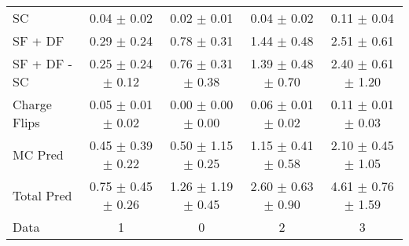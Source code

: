 \begin{tabular}{l|cccc}
                                 SC &  0.04 $\pm$  0.02 &  0.02 $\pm$  0.01 &  0.04 $\pm$  0.02 &  0.11 $\pm$  0.04 \\
                            SF + DF &  0.29 $\pm$  0.24 &  0.78 $\pm$  0.31 &  1.44 $\pm$  0.48 &  2.51 $\pm$  0.61 \\
\hline
                       SF + DF - SC &  0.25 $\pm$  0.24 $\pm$  0.12 &  0.76 $\pm$  0.31 $\pm$  0.38 &  1.39 $\pm$  0.48 $\pm$  0.70 &  2.40 $\pm$  0.61 $\pm$  1.20 \\
\hline\hline
                       Charge Flips &  0.05 $\pm$  0.01 $\pm$  0.02 &  0.00 $\pm$  0.00 $\pm$  0.00 &  0.06 $\pm$  0.01 $\pm$  0.02 &  0.11 $\pm$  0.01 $\pm$  0.03 \\
\hline
                            MC Pred &  0.45 $\pm$  0.39 $\pm$  0.22 &  0.50 $\pm$  1.15 $\pm$  0.25 &  1.15 $\pm$  0.41 $\pm$  0.58 &  2.10 $\pm$  0.45 $\pm$  1.05 \\
\hline
                         Total Pred &  0.75 $\pm$  0.45 $\pm$  0.26 &  1.26 $\pm$  1.19 $\pm$  0.45 &  2.60 $\pm$  0.63 $\pm$  0.90 &  4.61 $\pm$  0.76 $\pm$  1.59 \\
\hline\hline
                               Data &     1 &     0 &     2 &     3 \\
\hline\hline
\end{tabular}


